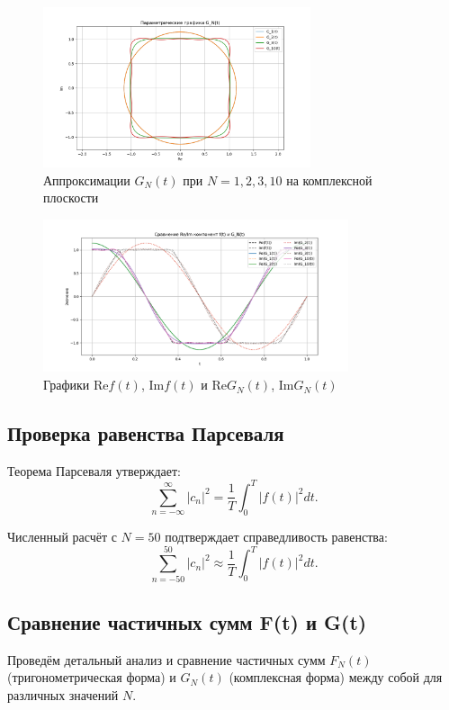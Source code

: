 \begin{figure}[H]
    \centering
    \includegraphics[width=0.7\textwidth]{gn_parametric.png}
    \caption{Аппроксимации $G_N(t)$ при $N=1,2,3,10$ на комплексной плоскости}
\end{figure}

\begin{figure}[H]
    \centering
    \includegraphics[width=0.8\textwidth]{re_im_comparison.png}
    \caption{Графики $\text{Re} f(t)$, $\text{Im} f(t)$ и $\text{Re} G_N(t)$, $\text{Im} G_N(t)$}
\end{figure}

\subsection*{Проверка равенства Парсеваля}

Теорема Парсеваля утверждает:
\[
\sum_{n=-\infty}^{\infty} |c_n|^2 = \frac{1}{T} \int_0^T |f(t)|^2 dt.
\]

Численный расчёт с $N = 50$ подтверждает справедливость равенства:
\[
\sum_{n=-50}^{50} |c_n|^2 \approx \frac{1}{T} \int_0^T |f(t)|^2 dt.
\]
\subsection*{Сравнение частичных сумм F(t) и G(t)}

Проведём детальный анализ и сравнение частичных сумм $F_N(t)$ (тригонометрическая форма) и $G_N(t)$ (комплексная форма) между собой для различных значений $N$.

